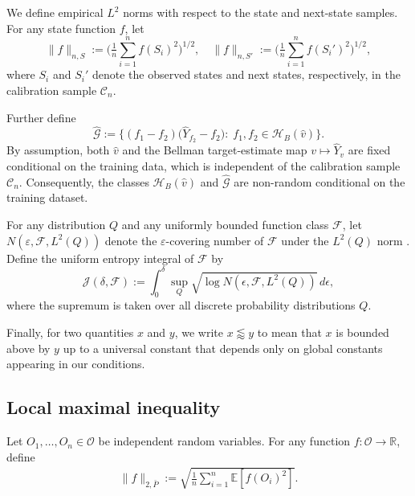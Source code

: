 \documentclass{article}
\theoremstyle{plain}
\theoremstyle{definition}
\theoremstyle{remark}
\begin{document}
We define empirical \(L^2\) norms with respect to the state and next-state samples.  For any state function \(f\), let
\[
\|f\|_{n,S}
:= 
\Big( \tfrac{1}{n} \sum_{i=1}^{n} f(S_i)^2 \Big)^{1/2},
\quad
\|f\|_{n,S'}
:= 
\Big( \tfrac{1}{n} \sum_{i=1}^{n} f(S_i')^2 \Big)^{1/2},
\]
where \(S_i\) and \(S_i'\) denote the observed states and next states, respectively, in the calibration sample \(\mathcal{C}_n\).



 





Further define
\[
\widehat{\mathcal{G}}
:= 
\Big\{ (f_1 - f_2)\big(\widehat Y_{f_2} - f_2\big)
:\;
f_1, f_2 \in \mathcal H_B(\hat v) \Big\}.
\]
By assumption, both \(\hat{v}\) and the Bellman target-estimate map
\(v\mapsto\widehat Y_v\) are fixed conditional on the training data, which is
independent of the calibration sample \(\mathcal{C}_n\). Consequently, the
classes \(\mathcal H_B(\hat v)\) and \(\widehat{\mathcal{G}}\) are
non-random conditional on the training dataset.

For any distribution \(Q\) and any uniformly bounded function class \(\mathcal{F}\), let  
\(N(\varepsilon, \mathcal{F}, L^2(Q))\) denote the \(\varepsilon\)-covering number of \(\mathcal{F}\) under the \(L^2(Q)\) norm \citep{van1996weak}.  
Define the uniform entropy integral of \(\mathcal{F}\) by
\begin{equation*}
\mathcal{J}(\delta, \mathcal{F})
:=
\int_{0}^{\delta}
\sup_{Q}
\sqrt{\log N(\epsilon, \mathcal{F}, L^2(Q))}\, d\epsilon ,
\end{equation*}
where the supremum is taken over all discrete probability distributions \(Q\).

Finally, for two quantities \(x\) and \(y\), we write \(x \lessapprox y\) to mean that \(x\) is bounded above by \(y\) up to a universal constant that depends only on global constants appearing in our conditions.


\subsection{Local maximal inequality}

 Let $O_1,\ldots,O_n \in \mathcal{O}$ be independent random variables. For any function $f:\mathcal{O} \to \mathbb{R}$, define
\begin{align}
   \|f\|_{2,\bar P} := \sqrt{\frac{1}{n} \sum_{i=1}^n\mathbb{E}[f(O_i)^2]}.
\end{align}
 
\end{document}
